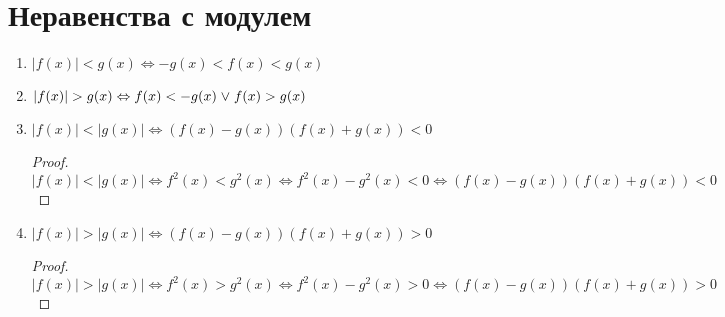 \section{Неравенства с модулем}
\begin{enumerate}
	\item $|f(x)| < g(x) \Leftrightarrow -g(x) < f(x) < g(x)$
	
	\item $|f(x)| > g(x) \Leftrightarrow f(x) < -g(x) \mathrel{\lor} f(x) > g(x)$
	
	\item $|f(x)| < |g(x)| \Leftrightarrow (f(x) - g(x))(f(x) + g(x)) < 0$
	\begin{proof}
	\begin{equation*}
	|f(x)| < |g(x)| \Leftrightarrow
	f^2(x) < g^2(x) \Leftrightarrow
	f^2(x) - g^2(x) < 0 \Leftrightarrow
	(f(x) - g(x))(f(x) + g(x)) < 0
	\end{equation*}
	\end{proof}
	
	\item $|f(x)| > |g(x)| \Leftrightarrow (f(x) - g(x))(f(x) + g(x)) > 0$
	\begin{proof}
	\begin{equation*}
	|f(x)| > |g(x)| \Leftrightarrow
	f^2(x) > g^2(x) \Leftrightarrow
	f^2(x) - g^2(x) > 0 \Leftrightarrow
	(f(x) - g(x))(f(x) + g(x)) > 0
	\end{equation*}
	\end{proof}
\end{enumerate}